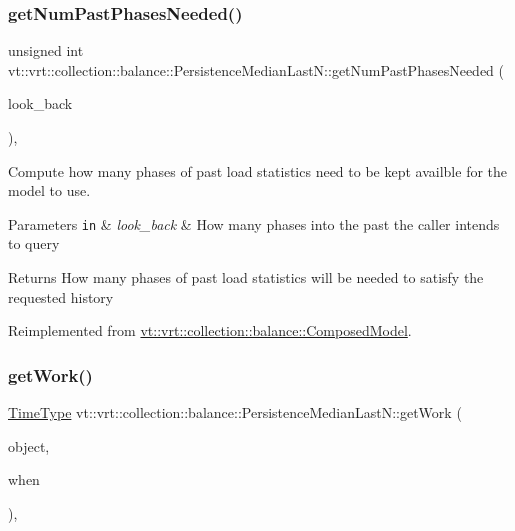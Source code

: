 \subsubsection{\texorpdfstring{get\+Num\+Past\+Phases\+Needed()}{getNumPastPhasesNeeded()}}
{\footnotesize\ttfamily unsigned int vt\+::vrt\+::collection\+::balance\+::\+Persistence\+Median\+Last\+N\+::get\+Num\+Past\+Phases\+Needed (\begin{DoxyParamCaption}\item[{unsigned int}]{look\+\_\+back }\end{DoxyParamCaption})\hspace{0.3cm}{\ttfamily [override]}, {\ttfamily [virtual]}}



Compute how many phases of past load statistics need to be kept availble for the model to use. 


\begin{DoxyParams}[1]{Parameters}
\mbox{\tt in}  & {\em look\+\_\+back} & How many phases into the past the caller intends to query\\
\hline
\end{DoxyParams}
\begin{DoxyReturn}{Returns}
How many phases of past load statistics will be needed to satisfy the requested history 
\end{DoxyReturn}


Reimplemented from \hyperlink{classvt_1_1vrt_1_1collection_1_1balance_1_1_composed_model_abf2a02ff624e66c7076bfe3dce961981}{vt\+::vrt\+::collection\+::balance\+::\+Composed\+Model}.

\mbox{\label{structvt_1_1vrt_1_1collection_1_1balance_1_1_persistence_median_last_n_a905b84cb14c5326bdce4b761e4fd3106}} 
\subsubsection{\texorpdfstring{get\+Work()}{getWork()}}
{\footnotesize\ttfamily \hyperlink{namespacevt_a876a9d0cd5a952859c72de8a46881442}{Time\+Type} vt\+::vrt\+::collection\+::balance\+::\+Persistence\+Median\+Last\+N\+::get\+Work (\begin{DoxyParamCaption}\item[{\hyperlink{structvt_1_1vrt_1_1collection_1_1balance_1_1_element_i_d_struct}{Element\+I\+D\+Struct}}]{object,  }\item[{\hyperlink{structvt_1_1vrt_1_1collection_1_1balance_1_1_phase_offset}{Phase\+Offset}}]{when }\end{DoxyParamCaption})\hspace{0.3cm}{\ttfamily [override]}, {\ttfamily [virtual]}}



